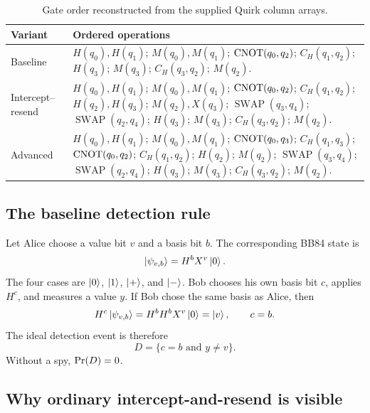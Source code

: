 \begin{table}[ht]
\centering
\caption{Gate order reconstructed from the supplied Quirk column arrays.}
\label{tab:caseii-gate-order}
\begin{tabular}{@{}p{}p{}@{}}
\toprule
Variant & Ordered operations \\
\midrule
Baseline &
$H(q_0),H(q_1)$; $M(q_0),M(q_1)$;
$\operatorname{CNOT}(q_0,q_2)$; $C_H(q_1,q_2)$;
$H(q_3)$; $M(q_3)$; $C_H(q_3,q_2)$; $M(q_2)$.\\[0.4em]
Intercept--resend &
$H(q_0),H(q_1)$; $M(q_0),M(q_1)$;
$\operatorname{CNOT}(q_0,q_2)$; $C_H(q_1,q_2)$;
$H(q_2),H(q_3)$; $M(q_2),X(q_3)$;
$\operatorname{SWAP}(q_3,q_4)$;
$\operatorname{SWAP}(q_2,q_4)$;
$H(q_3)$; $M(q_3)$; $C_H(q_3,q_2)$; $M(q_2)$.\\[0.4em]
Advanced &
$H(q_0),H(q_1)$; $M(q_0),M(q_1)$;
$\operatorname{CNOT}(q_0,q_3)$; $C_H(q_1,q_3)$;
$\operatorname{CNOT}(q_0,q_2)$; $C_H(q_1,q_2)$;
$H(q_2)$; $M(q_2)$;
$\operatorname{SWAP}(q_3,q_4)$;
$\operatorname{SWAP}(q_2,q_4)$;
$H(q_3)$; $M(q_3)$; $C_H(q_3,q_2)$; $M(q_2)$.\\
\bottomrule
\end{tabular}
\end{table}

\subsection{The baseline detection rule}

Let Alice choose a value bit $v$ and a basis bit $b$. The corresponding BB84
state is
\begin{equation}
  \ket{\psi_{v,b}}=H^bX^v\ket{0}.
  \label{eq:caseii-bb84-state}
\end{equation}
The four cases are $\ket{0}$, $\ket{1}$, $\ket{+}$, and $\ket{-}$. Bob chooses
his own basis bit $c$, applies $H^c$, and measures a value $y$. If Bob chose the
same basis as Alice, then
\begin{equation}
  H^c\ket{\psi_{v,b}}
  =H^bH^bX^v\ket{0}
  =\ket{v},
  \qquad c=b.
\end{equation}
The ideal detection event is therefore
\begin{equation}
  D=\{c=b\text{ and }y\neq v\}.
  \label{eq:caseii-detection-event}
\end{equation}
Without a spy, $\operatorname{Pr}(D)=0$.

\subsection{Why ordinary intercept-and-resend is visible}


